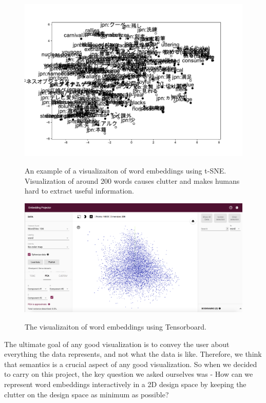 \begin{figure}[htb]
 \centering
     {\includegraphics[width=0.78\linewidth]{figures/t_sne_en_jp_cluttered.pdf}}
    \vspace{-1ex}
     \caption{An example of a visualizaiton of word embeddings using t-SNE. Visualization of around 200 words causes clutter and makes humans hard to extract useful information. }
\label{fig:t_sne}
\end{figure}


\begin{figure}[htb]
 \centering
     {\includegraphics[width=0.78\linewidth]{figures/tensorboard.png}}
    \vspace{-1ex}
     \caption{The visualizaiton of word embeddings using Tensorboard.}
\label{fig:tensorboard}
\end{figure}



The ultimate goal of any good visualization is to convey the user about everything the data represents, and not what the data is like. Therefore, we think that semantics is a crucial aspect of any good visualization. So when we decided to carry on this project, the key question we asked ourselves was - How can we represent word embeddings interactively in a 2D design space by keeping the clutter on the design space as minimum as possible? 


